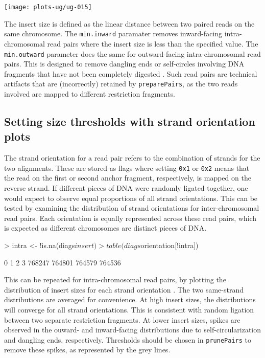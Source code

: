 \documentclass[12pt]{report}
\renewenvironment{Schunk}{\vspace{0pt}}{\vspace{0pt}}
\newcommand{\code}[1]{{\small\texttt{#1}}}
\begin{document}
\begin{center}
\texttt{[image: plots-ug/ug-015]}
\end{center}

The insert size is defined as the linear distance between two paired reads on the same chromosome.
The \code{min.inward} paramater removes inward-facing intra-chromosomal read pairs where the insert size is less than the specified value.
The \code{min.outward} parameter does the same for outward-facing intra-chromosomal read pairs.
This is designed to remove dangling ends or self-circles involving DNA fragments that have not been completely digested \citep{jin2013highres}.
Such read pairs are technical artifacts that are (incorrectly) retained by \code{preparePairs}, as the two reads involved are mapped to different restriction fragments.

\subsection{Setting size thresholds with strand orientation plots}
\label{sec:strorient}
The strand orientation for a read pair refers to the combination of strands for the two alignments.
These are stored as flags where setting \code{0x1} or \code{0x2} means that the read on the first or second anchor fragment, respectively, is mapped on the reverse strand.
If different pieces of DNA were randomly ligated together, one would expect to observe equal proportions of all strand orientations. 
This can be tested by examining the distribution of strand orientations for inter-chromosomal read pairs.
Each orientation is equally represented across these read pairs, which is expected as different chromosomes are distinct pieces of DNA.

\begin{Schunk}
\begin{Sinput}
> intra <- !is.na(diags$insert)
> table(diags$orientation[!intra])
\end{Sinput}
\begin{Soutput}
     0      1      2      3 
768247 764801 764579 764536 
\end{Soutput}
\end{Schunk}

This can be repeated for intra-chromosomal read pairs, by plotting the distribution of insert sizes for each strand orientation \citep{jin2013highres}.
The two same-strand distributions are averaged for convenience.
At high insert sizes, the distributions will converge for all strand orientations.
This is consistent with random ligation between two separate restriction fragments.
At lower insert sizes, spikes are observed in the ouward- and inward-facing distributions due to self-circularization and dangling ends, respectively.
Thresholds should be chosen in \code{prunePairs} to remove these spikes, as represented by the grey lines.
\end{document}

